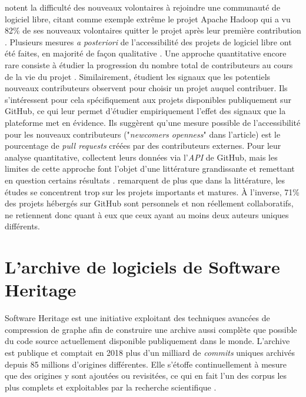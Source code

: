 \documentclass[dvipsnames,runningheads]{llncs}
\newcommand{\en}[1]{\foreignlanguage{english}{\emph{#1}}}
\begin{document}
    \textcite{barriers-2018} notent la difficulté des nouveaux volontaires à rejoindre une communauté de
    logiciel libre, citant comme exemple extrême le projet Apache Hadoop qui a vu 82\% de ses nouveaux
    volontaires quitter le projet après leur première contribution \parencite{hadoop-dropout-2013}. Plusieurs
    mesures \emph{a posteriori} de l'accessibilité des projets de logiciel libre ont été faites, en majorité
    de façon qualitative \parencites{newcomers-accessibility-2016}{newcomers-onboarding-2018}. Une approche
    quantitative encore rare consiste à étudier la progression du nombre total de contributeurs au cours de la
    vie du projet \cite{contributor-count-2006}. Similairement, \textcite{signals-2019} étudient les signaux
    que les potentiels nouveaux contributeurs observent pour choisir un projet auquel contribuer. Ils
    s'intéressent pour cela spécifiquement aux projets disponibles publiquement sur GitHub, ce qui leur permet
    d'étudier empiriquement l'effet des signaux que la plateforme met en évidence. Ils suggèrent qu'une mesure
    possible de l'accessibilité pour les nouveaux contributeurs ("\en{newcomers openness}" dans l'article) est
    le pourcentage de \en{pull requests} créées par des contributeurs externes. Pour leur analyse
    quantitative, \textcite{signals-2019} collectent leurs données via l'\en{API} de GitHub, mais les limites
    de cette approche font l'objet d'une littérature grandissante et remettant en question certains résultats
    \parencite{mining-github-2014,penumbra-oss-2022}. \textcite{barriers-meta-2015} remarquent de plus que
    dans la littérature, les études se concentrent trop sur les projets importants et matures. À l'inverse,
    71\% des projets hébergés sur GitHub sont personnels et non réellement collaboratifs,
    \textcite{mining-github-2014} ne retiennent donc quant à eux que ceux ayant au moins deux auteurs uniques
    différents.

    \section{L'archive de logiciels de Software Heritage}

    \label{ssec:swh-graph}

    Software Heritage est une initiative exploitant des techniques avancées de compression de graphe afin de
    construire une archive aussi complète que possible du code source actuellement disponible publiquement
    dans le monde. L'archive est publique et comptait en 2018 plus d'un milliard de \en{commits} uniques
    archivés depuis 85 millions d'origines différentes. Elle s'étoffe continuellement à mesure que des
    origines y sont ajoutées ou revisitées, ce qui en fait l'un des corpus les plus complets et exploitables
    par la recherche scientifique \parencite{swh-2019,swh-growth-2019}.
\end{document}
